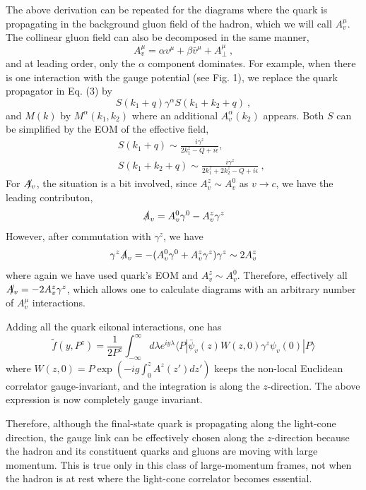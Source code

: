 \documentclass[prd,aps,twocolumn,preprintnumbers,showpacs,nofootinbib,superscriptaddress,notitlepage]{revtex4-1}
\begin{document}
The above derivation can be repeated for the diagrams where the quark is propagating in the background gluon field of the hadron, which we will call $A_v^\mu$. The collinear gluon field can also be decomposed in the same manner, 
\begin{equation}
  A^\mu_v  = \alpha v^\mu + \beta \bar v^\mu + A_\perp^\mu \ , 
\end{equation}
and at leading order, only the $\alpha$ component dominates. 
For example, when there is one interaction with the gauge potential (see Fig. 1), we replace the quark propagator in Eq. (3) by 
\begin{equation}
      S(k_1+q) \gamma^\alpha S(k_1+k_2+q) \ ,  
\end{equation}
and $M(k)$ by $M^\alpha(k_1,k_2)$ where an additional $A_v^\alpha(k_2)$ appears. 
Both $S$ can be simplified by the EOM of the effective field, 
\begin{eqnarray}
   && S(k_1+q) \sim \frac{i\gamma^z}{2k_1^z-Q+i\epsilon}, \nonumber \\  && S(k_1+k_2+q) \sim \frac{i\gamma^z}{2k_1^z+2k_2^z-Q+i\epsilon}
\ , \end{eqnarray}
For $\slashed{A_v}$, the situation is a bit involved, 
since $A^z_v \sim A^0_v$ as $v\to c$, we have the leading contributon,  
\begin{equation}
   \slashed{A}_v = A^0_v\gamma^0 - A^z_v \gamma^z 
\end{equation}
However, after commutation with $\gamma^z$, 
we have 
\begin{equation}
   \gamma^z \slashed{A}_v = -(A^0_v\gamma^0+A^z_v\gamma^z) \gamma^z 
                         \sim  2A^z_v
\end{equation}
where again we have used quark's EOM and $A^z_v \sim A^0_v$. 
Therefore, effectively all $\slashed{A_v} = -2A^z_v \gamma^z$, which allows one to calculate diagrams with an arbitrary number of $A^\mu_v$ interactions. 

Adding all the quark eikonal interactions, one has 
    \begin{equation}
    \tilde f(y, P^z) = \frac{1}{2P^z} \int^\infty_{-\infty} d\lambda   e^{iy\lambda} \langle P|\bar \psi_v(z)W(z, 0)\gamma^z \psi_v(0)|P\rangle
\end{equation}
where $W(z,0)=P\exp\left(-ig\int^z_0 A^z(z')dz'\right)$ keeps the non-local Euclidean correlator gauge-invariant, and the integration is along 
the $z$-direction. The above expression is now completely gauge invariant. 

Therefore, although the final-state quark is propagating along the light-cone direction, the gauge link can be effectively chosen along the $z$-direction because the hadron and its constituent quarks and gluons
are moving with large momentum. This is true only in this class of large-momentum frames, 
not when the hadron is at rest where the light-cone correlator becomes essential.
\end{document}
